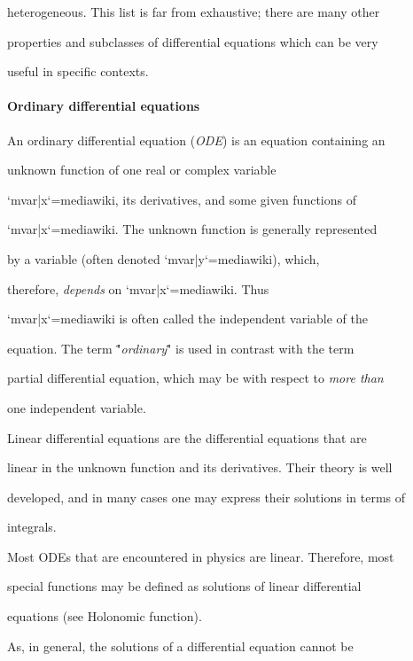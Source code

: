 heterogeneous. This list is far from exhaustive; there are many other

properties and subclasses of differential equations which can be very

useful in specific contexts.



\paragraph{Ordinary differential equations}



An ordinary differential equation (\textit{ODE}) is an equation containing an

unknown function of one real or complex variable

`{{mvar|x}}`{=mediawiki}, its derivatives, and some given functions of

`{{mvar|x}}`{=mediawiki}. The unknown function is generally represented

by a variable (often denoted `{{mvar|y}}`{=mediawiki}), which,

therefore, \textit{depends} on `{{mvar|x}}`{=mediawiki}. Thus

`{{mvar|x}}`{=mediawiki} is often called the independent variable of the

equation. The term \""\textit{ordinary}\"" is used in contrast with the term

partial differential equation, which may be with respect to \textit{more than}

one independent variable.



Linear differential equations are the differential equations that are

linear in the unknown function and its derivatives. Their theory is well

developed, and in many cases one may express their solutions in terms of

integrals.



Most ODEs that are encountered in physics are linear. Therefore, most

special functions may be defined as solutions of linear differential

equations (see Holonomic function).



As, in general, the solutions of a differential equation cannot be

